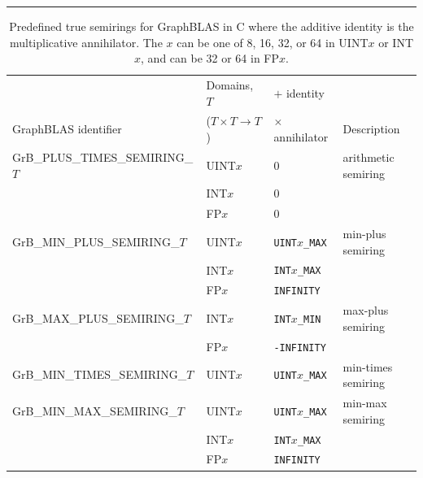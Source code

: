 \begin{table}
\centering
\begin{threeparttable}
\hrule
\caption[Predefined ``true'' semirings for GraphBLAS in C.]{Predefined true semirings 
for GraphBLAS in C where the additive identity is the multiplicative 
annihilator. The $x$ can be one of 8, 16, 32, or 64 in {\sf UINT$x$} or {\sf INT$x$}, 
and can be 32 or 64 in {\sf FP$x$}.}
\label{Tab:PredefinedTrueSemirings}

\hspace*{-1.5em}
\begin{tabular}{l|l|l|l}
                                      & Domains, $T$             & $+$ identity         &                 \\
GraphBLAS identifier              & ($T \times T \rightarrow T$) & $\times$ annihilator & Description     \\ \hline
{\sf GrB\_PLUS\_TIMES\_SEMIRING\_$T$}   & {\sf UINT$x$}            & 0                    & arithmetic semiring \\
                                      & {\sf INT$x$}             & 0                    &                 \\
                                      & {\sf FP$x$}              & 0                    &                 \\
{\sf GrB\_MIN\_PLUS\_SEMIRING\_$T$}     & {\sf UINT$x$}            & {\tt UINT$x$\_MAX}   & min-plus semiring  \\
                                      & {\sf INT$x$}             & {\tt INT$x$\_MAX}    &                 \\
                                      & {\sf FP$x$}              & {\tt INFINITY}       &                 \\
{\sf GrB\_MAX\_PLUS\_SEMIRING\_$T$}     & {\sf INT$x$}             & {\tt INT$x$\_MIN}    & max-plus semiring  \\
                                      & {\sf FP$x$}              & {\tt -INFINITY}      &                 \\
{\sf GrB\_MIN\_TIMES\_SEMIRING\_$T$}    & {\sf UINT$x$}            & {\tt UINT$x$\_MAX}   & min-times semiring \\
{\sf GrB\_MIN\_MAX\_SEMIRING\_$T$}      & {\sf UINT$x$}            & {\tt UINT$x$\_MAX}   & min-max semiring   \\
                                      & {\sf INT$x$}             & {\tt INT$x$\_MAX}    &                 \\
                                      & {\sf FP$x$}              & {\tt INFINITY}       &                 \\

\end{tabular}
\end{threeparttable}
\end{table}
